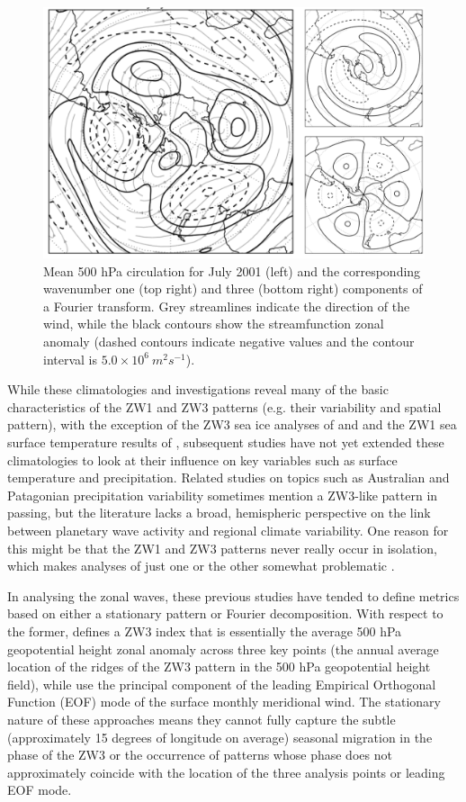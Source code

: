 \begin{figure}
\begin{center}
\includegraphics[width=0.7\columnwidth]{figures/zonalwaves/zw_example.png}
\caption{\label{fig:zw_example}
Mean 500 hPa circulation for July 2001 (left) and the corresponding wavenumber one (top right) and three (bottom right) components of a Fourier transform. Grey streamlines indicate the direction of the wind, while the black contours show the streamfunction zonal anomaly (dashed contours indicate negative values and the contour interval is $5.0 \times 10^6 \: m^2 s^{-1}$).%
}
\end{center}
\end{figure}


While these climatologies and investigations reveal many of the basic characteristics of the ZW1 and ZW3 patterns (e.g. their variability and spatial pattern), with the exception of the ZW3 sea ice analyses of \citet{Raphael2007} and \citet{Yuan2008} and the ZW1 sea surface temperature results of \citet{Hobbs2007}, subsequent studies have not yet extended these climatologies to look at their influence on key variables such as surface temperature and precipitation. Related studies on topics such as Australian \citep{Frederiksen2014} and Patagonian \citep{Garreaud2013} precipitation variability sometimes mention a ZW3-like pattern in passing, but the literature lacks a broad, hemispheric perspective on the link between planetary wave activity and regional climate variability. One reason for this might be that the ZW1 and ZW3 patterns never really occur in isolation, which makes analyses of just one or the other somewhat problematic \citep{Hobbs2010}.

In analysing the zonal waves, these previous studies have tended to define metrics based on either a stationary pattern or Fourier decomposition. With respect to the former, \citet{Raphael2004} defines a ZW3 index that is essentially the average 500 hPa geopotential height zonal anomaly across three key points (the annual average location of the ridges of the ZW3 pattern in the 500 hPa geopotential height field), while \citet{Yuan2008} use the principal component of the leading Empirical Orthogonal Function (EOF) mode of the surface monthly meridional wind. The stationary nature of these approaches means they cannot fully capture the subtle (approximately 15 degrees of longitude on average) seasonal migration in the phase of the ZW3 \citep{vanLoon1984,Mo1985} or the occurrence of patterns whose phase does not approximately coincide with the location of the three analysis points or leading EOF mode.

